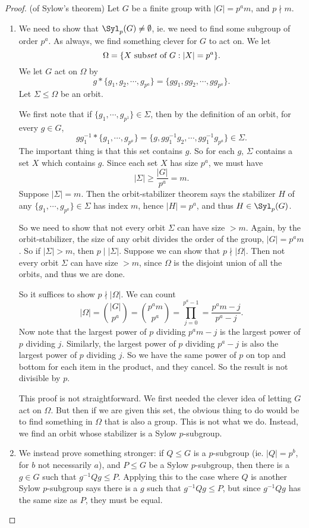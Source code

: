 \documentclass[a4paper]{article}
\begin{document}
\begin{proof}(of Sylow's theorem)
  Let $G$ be a finite group with $|G| = p^a m$, and $p \nmid m$.
  \begin{enumerate}
    \item We need to show that $\Syl_p(G) \not= \emptyset$, ie. we need to find some subgroup of order $p^a$. As always, we find something clever for $G$ to act on. We let
      \[
        \Omega = \{X\text{ sub\emph{set} of }G: |X| = p^a\}.
      \]
      We let $G$ act on $\Omega$ by
      \[
        g * \{g_1, g_2, \cdots, g_{p^a}\} = \{gg_1, gg_2, \cdots, gg_{p^a}\}.
      \]
      Let $\Sigma \leq \Omega$ be an orbit.

      We first note that if $\{g_1, \cdots, g_{p^1}\} \in \Sigma$, then by the definition of an orbit, for every $g \in G$,
      \[
        gg_1^{-1} * \{g_1, \cdots, g_{p^a}\} = \{g, gg_1^{-1}g_2, \cdots, gg_1^{-1} g_{p^a}\} \in \Sigma.
      \]
      The important thing is that this set contains $g$. So for each $g$, $\Sigma$ contains a set $X$ which contains $g$. Since each set $X$ has size $p^a$, we must have
      \[
        |\Sigma| \geq \frac{|G|}{p^a} = m.
      \]
      Suppose $|\Sigma| = m$. Then the orbit-stabilizer theorem says the stabilizer $H$ of any $\{g_1, \cdots, g_{p^a}\} \in \Sigma$ has index $m$, hence $|H| = p^a$, and thus $H \in \Syl_p(G)$.

      So we need to show that not every orbit $\Sigma$ can have size $> m$. Again, by the orbit-stabilizer, the size of any orbit divides the order of the group, $|G| = p^a m$. So if $|\Sigma| > m$, then $p \mid |\Sigma|$. Suppose we can show that $p \nmid |\Omega|$. Then not every orbit $\Sigma$ can have size $> m$, since $\Omega$ is the disjoint union of all the orbits, and thus we are done.

      So it suffices to show $p \nmid |\Omega|$. We can count
      \[
        |\Omega| = \binom{|G|}{p^a} = \binom{p^a m}{p^a} = \prod_{j = 0}^{p^a - 1} = \frac{p^a m - j}{p^a - j}.
      \]
      Now note that the largest power of $p$ dividing $p^am - j$ is the largest power of $p$ dividing $j$. Similarly, the largest power of $p$ dividing $p^a - j$ is also the largest power of $p$ dividing $j$. So we have the same power of $p$ on top and bottom for each item in the product, and they cancel. So the result is not divisible by $p$.

      This proof is not straightforward. We first needed the clever idea of letting $G$ act on $\Omega$. But then if we are given this set, the obvious thing to do would be to find something in $\Omega$ that is also a group. This is not what we do. Instead, we find an orbit whose stabilizer is a Sylow $p$-subgroup.
    \item We instead prove something stronger: if $Q \leq G$ is a $p$-subgroup (ie. $|Q| = p^b$, for $b$ not necessarily $a$), and $P \leq G$ be a Sylow $p$-subgroup, then there is a $g \in G$ such that $g^{-1} Qg \leq P$. Applying this to the case where $Q$ is another Sylow $p$-subgroup says there is a $g$ such that $g^{-1}Qg \leq P$, but since $g^{-1}Qg$ has the same size as $P$, they must be equal.


\end{enumerate}
\end{proof}
\end{document}
